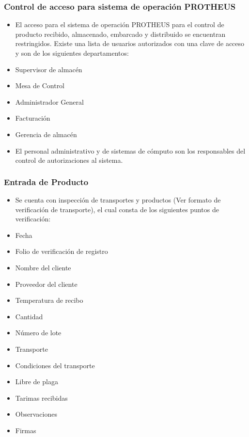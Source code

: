 \subsubsection{Control de acceso para sistema de operación PROTHEUS}

\begin{itemize}
	\item El acceso para el sistema de operación PROTHEUS para el control de producto recibido, almacenado, embarcado y distribuido se encuentran restringidos. Existe una lista de usuarios autorizados con una clave de acceso y son de los siguientes departamentos:
	\item Supervisor de almacén
	\item Mesa de Control
	\item Administrador General
	\item Facturación
	\item Gerencia de almacén
	\item El personal administrativo y de sistemas de cómputo son los responsables del control de autorizaciones al sistema.
\end{itemize}

\subsubsection{Entrada de Producto}

\begin{itemize}
	\item Se cuenta con inspección de transportes y productos (Ver formato de verificación de transporte), el cual consta de los siguientes puntos de verificación:
	\item Fecha
	\item Folio de verificación de registro
	\item Nombre del cliente
	\item Proveedor del cliente
	\item Temperatura de recibo
	\item Cantidad
	\item Número de lote
	\item Transporte
	\item Condiciones del transporte
	\item Libre de plaga
	\item Tarimas recibidas
	\item Observaciones
	\item Firmas
\end{itemize}

